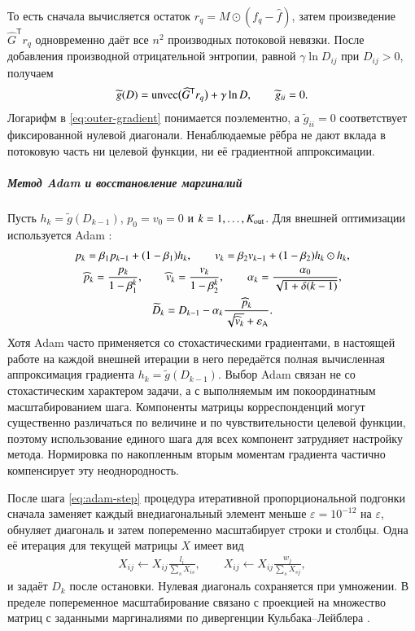 \documentclass{crm-article}
\begin{document}
То есть сначала вычисляется остаток
$r_q=M\odot(f_q-\widehat f)$, затем произведение $\widehat G^{\mathsf T}r_q$
одновременно даёт все $n^2$ производных потоковой невязки. После добавления
производной отрицательной энтропии, равной $\gamma\ln D_{ij}$ при $D_{ij}>0$,
получаем
\begin{gather}
 \widetilde g(D)=\mathop{\rm unvec}\bigl(\widehat G^{\mathsf T}r_q\bigr)
 +\gamma\ln D,
 \qquad \widetilde g_{ii}=0.
 \label{eq:outer-gradient}
\end{gather}
Логарифм в \eqref{eq:outer-gradient} понимается поэлементно, а
$\widetilde g_{ii}=0$ соответствует фиксированной нулевой диагонали.
Ненаблюдаемые рёбра не дают вклада в потоковую часть ни целевой функции, ни её
градиентной аппроксимации.

\subparagraph{Метод Adam и восстановление маргиналий}

Пусть $h_k=\widetilde g(D_{k-1})$, $p_0=v_0=0$ и
$k=1,\ldots,K_{\rm out}$. Для внешней оптимизации используется Adam
\cite{KingmaBa2015}:
\begin{gather}
 p_k=\beta_1p_{k-1}+(1-\beta_1)h_k,\qquad
 v_k=\beta_2v_{k-1}+(1-\beta_2)h_k\odot h_k,
 \label{eq:adam-moments}\\
 \widehat p_k=\frac{p_k}{1-\beta_1^k},\qquad
 \widehat v_k=\frac{v_k}{1-\beta_2^k},\qquad
 \alpha_k=\frac{\alpha_0}{\sqrt{1+\delta(k-1)}},
 \label{eq:adam-correction}\\
 \widetilde D_k=D_{k-1}-\alpha_k
 \frac{\widehat p_k}{\sqrt{\widehat v_k}+\varepsilon_{\rm A}}.
 \label{eq:adam-step}
\end{gather}
Хотя Adam часто применяется со стохастическими градиентами, в настоящей
работе на каждой внешней итерации в него передаётся полная вычисленная
аппроксимация градиента $h_k=\widetilde g(D_{k-1})$. Выбор Adam связан не со
стохастическим характером задачи, а с выполняемым им покоординатным
масштабированием шага. Компоненты матрицы корреспонденций могут существенно
различаться по величине и по чувствительности целевой функции, поэтому
использование единого шага для всех компонент затрудняет настройку метода.
Нормировка по накопленным вторым моментам градиента частично компенсирует эту
неоднородность.

После шага \eqref{eq:adam-step} процедура итеративной пропорциональной
подгонки сначала заменяет каждый
внедиагональный элемент меньше $\varepsilon=10^{-12}$ на $\varepsilon$, обнуляет
диагональ и затем попеременно масштабирует строки и столбцы. Одна её итерация
для текущей матрицы $X$ имеет вид
\begin{gather}
 X_{ij}\leftarrow X_{ij}\frac{l_i}{\sum_s X_{is}},\qquad
 X_{ij}\leftarrow X_{ij}\frac{w_j}{\sum_s X_{sj}},
 \label{eq:ipf}
\end{gather}
и задаёт $D_k$ после остановки. Нулевая диагональ сохраняется при умножении.
В пределе попеременное масштабирование связано с проекцией на множество
матриц с заданными маргиналиями по дивергенции Кульбака--Лейблера
\cite{SinkhornKnopp1967}.
\end{document}

